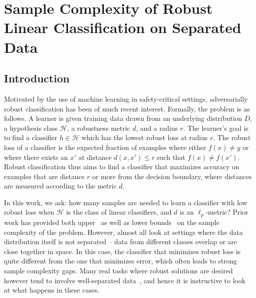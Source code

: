\graphicspath{{./chapters/chapter2/}}

\def\D{{\mathcal D}}
\def\Pphi{\overline{\Phi}}
\def\F{{\mathcal F}}
\def\N{{\mathcal N}}
\def\E{{\mathbb E}}
\def\A{\Pi}
\def\B{\Sigma}
\def\diam{\text{diam}}
\def\c{\mathcal L}
\def\l{\ell}
\def\seq{seq}
\def\R{\mathbb{R}}
\def\C{\mathcal C}
\def\p{p}
\def\s{size}
\def\L{\mathcal L}
\def\o{opt}
\def\H{\mathcal H}
\def\calH{\mathcal H}
\def\of{approxCluster}
\def\on{onlineCluster}
\def\R{\mathbb R}
\def\Y{\{\pm 1\}}
\def\U{\mathbb U}
\def\dd{\Delta}
\def\simp{{U\Delta}}
\def\g{g}
\def\rr{R}
\def\f{f}


\chapter{Sample Complexity of Robust Linear Classification on Separated Data} 

\section{Introduction}

Motivated by the use of machine learning in safety-critical settings, adversarially robust classification has been of much recent interest. Formally, the problem is as follows. A learner is given training data drawn from an underlying distribution $D$, a hypothesis class $\calH$, a robustness metric $d$, and a radius $r$. The learner's goal is to find a classifier $h \in \calH$ which has the lowest robust loss at radius $r$. The robust loss of a classifier is the expected fraction of examples where either $f(x) \neq y$ or where there exists an $x'$ at distance $d(x, x') \leq r$ such that $f(x) \neq f(x')$.  Robust classification thus aims to find a classifier that maximizes accuracy on examples that are distance $r$ or more from the decision boundary, where distances are measured according to the metric $d$.


In this work, we ask: how many samples are needed to learn a classifier with low robust loss when $\calH$ is the class of linear classifiers, and $d$ is an $\ell_p$-metric? Prior work has provided both upper~\cite{bartlett19, ravikumar20} as well as lower bounds~\cite{Schmidt18, ravikumar20} on the sample complexity of the problem. However, almost all look at settings where the data distribution itself is not separated --  data from different classes overlap or are close together in space. In this case, the classifier that minimizes robust loss is quite different from the one that minimizes error, which often leads to strong sample complexity gaps. Many real tasks where robust solutions are desired however tend to involve well-separated data~\cite{Yang20}, and hence it is instructive to look at what happens in these cases.

